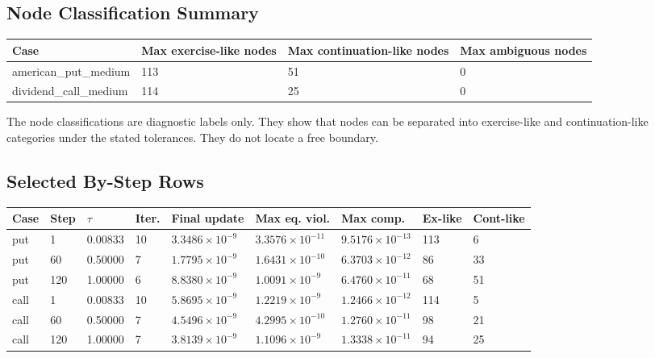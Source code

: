 \documentclass[11pt,a4paper]{article}
\begin{document}
\subsection{Node Classification Summary}

\begin{longtable}{@{}L{0.24\textwidth}L{0.18\textwidth}L{0.20\textwidth}L{0.18\textwidth}@{}}
\toprule
Case & Max exercise-like nodes & Max continuation-like nodes & Max ambiguous nodes \\
\midrule
\endhead
american\_put\_medium & 113 & 51 & 0 \\
dividend\_call\_medium & 114 & 25 & 0 \\
\bottomrule
\end{longtable}

The node classifications are diagnostic labels only. They show that nodes can be separated into
exercise-like and continuation-like categories under the stated tolerances. They do not locate a
free boundary.

\subsection{Selected By-Step Rows}

{\footnotesize
\setlength{\tabcolsep}{3pt}
\begin{longtable}{@{}L{0.18\textwidth}L{0.06\textwidth}L{0.08\textwidth}L{0.08\textwidth}L{0.10\textwidth}L{0.10\textwidth}L{0.10\textwidth}L{0.08\textwidth}L{0.08\textwidth}@{}}
\toprule
Case & Step & \(\tau\) & Iter. & Final update & Max eq. viol. & Max comp. & Ex-like & Cont-like \\
\midrule
\endhead
put & 1 & 0.00833 & 10 & \(3.3486\times10^{-9}\) & \(3.3576\times10^{-11}\) & \(9.5176\times10^{-13}\) & 113 & 6 \\
put & 60 & 0.50000 & 7 & \(1.7795\times10^{-9}\) & \(1.6431\times10^{-10}\) & \(6.3703\times10^{-12}\) & 86 & 33 \\
put & 120 & 1.00000 & 6 & \(8.8380\times10^{-9}\) & \(1.0091\times10^{-9}\) & \(6.4760\times10^{-11}\) & 68 & 51 \\
call & 1 & 0.00833 & 10 & \(5.8695\times10^{-9}\) & \(1.2219\times10^{-9}\) & \(1.2466\times10^{-12}\) & 114 & 5 \\
call & 60 & 0.50000 & 7 & \(4.5496\times10^{-9}\) & \(4.2995\times10^{-10}\) & \(1.2760\times10^{-11}\) & 98 & 21 \\
call & 120 & 1.00000 & 7 & \(3.8139\times10^{-9}\) & \(1.1096\times10^{-9}\) & \(1.3338\times10^{-11}\) & 94 & 25 \\
\bottomrule
\end{longtable}
}
\end{document}
